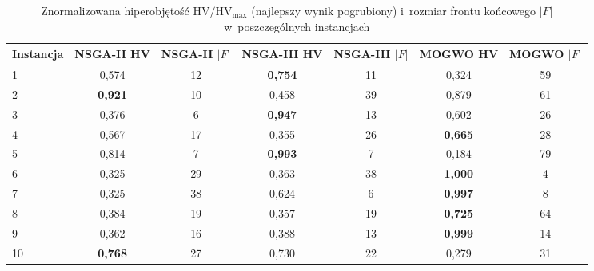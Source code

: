 \begin{table}[htbp]
    \centering
    \caption{Znormalizowana hiperobjętość $\mathrm{HV}/\mathrm{HV}_{\max}$ (najlepszy wynik pogrubiony) i~rozmiar frontu końcowego $|F|$ w~poszczególnych instancjach}
    \label{tab:per_run}
    \begin{tabular}{l c c c c c c}
        \hline
        Instancja & NSGA-II HV & NSGA-II $|F|$ & NSGA-III HV & NSGA-III $|F|$ & MOGWO HV & MOGWO $|F|$ \\
        \hline
        1 & 0{,}574 & 12 & \textbf{0{,}754} & 11 & 0{,}324 & 59 \\
        2 & \textbf{0{,}921} & 10 & 0{,}458 & 39 & 0{,}879 & 61 \\
        3 & 0{,}376 & 6 & \textbf{0{,}947} & 13 & 0{,}602 & 26 \\
        4 & 0{,}567 & 17 & 0{,}355 & 26 & \textbf{0{,}665} & 28 \\
        5 & 0{,}814 & 7 & \textbf{0{,}993} & 7 & 0{,}184 & 79 \\
        6 & 0{,}325 & 29 & 0{,}363 & 38 & \textbf{1{,}000} & 4 \\
        7 & 0{,}325 & 38 & 0{,}624 & 6 & \textbf{0{,}997} & 8 \\
        8 & 0{,}384 & 19 & 0{,}357 & 19 & \textbf{0{,}725} & 64 \\
        9 & 0{,}362 & 16 & 0{,}388 & 13 & \textbf{0{,}999} & 14 \\
        10 & \textbf{0{,}768} & 27 & 0{,}730 & 22 & 0{,}279 & 31 \\
        \hline
    \end{tabular}
\end{table}
